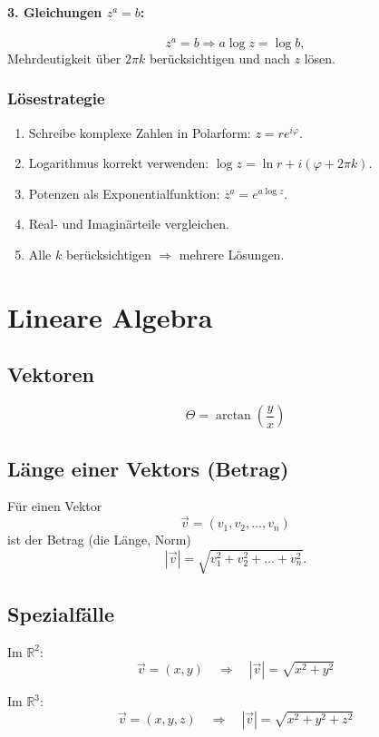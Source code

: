 \documentclass[9pt,a4paper]{article}
\begin{document}
    \paragraph{3. Gleichungen $z^a = b$:}
    \[
    z^a = b \Rightarrow a\log z = \log b,
    \]
    Mehrdeutigkeit über $2\pi k$ berücksichtigen und nach $z$ lösen.
    
    
    \subsubsection{Lösestrategie}
    \begin{enumerate}
        \item Schreibe komplexe Zahlen in Polarform: $z = re^{i\varphi}$.
        \item Logarithmus korrekt verwenden: $\log z = \ln r + i(\varphi + 2\pi k)$.
        \item Potenzen als Exponentialfunktion: $z^a = e^{a\log z}$.
        \item Real- und Imaginärteile vergleichen.
        \item Alle $k$ berücksichtigen $\Rightarrow$ mehrere Lösungen.
    \end{enumerate}
    
    \section{Lineare Algebra}
    \subsection{Vektoren}
    $$\Theta = \arctan(\frac{y}{x})$$
    \subsection{Länge einer Vektors (Betrag)}
    
    Für einen Vektor 
    \[
    \vec{v} = (v_1, v_2, \dots, v_n)
    \]
    ist der Betrag (die Länge, Norm)
    \[
    |\vec{v}| = \sqrt{v_1^2 + v_2^2 + \dots + v_n^2}.
    \]
    
    \subsection*{Spezialfälle}
    Im $\mathbb{R}^2$:
    \[
    \vec{v}=(x,y) \quad\Rightarrow\quad |\vec{v}|=\sqrt{x^2+y^2}
    \]
    
    Im $\mathbb{R}^3$:
    \[
    \vec{v}=(x,y,z) \quad\Rightarrow\quad |\vec{v}|=\sqrt{x^2+y^2+z^2}
    \]
    
\end{document}
